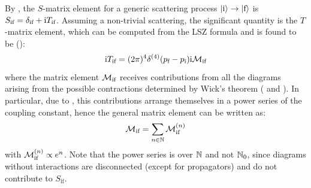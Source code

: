 By , the $ S $-matrix element for a generic scattering process $ \ket{\text{i}} \rightarrow \ket{\text{f}} $ is $ S_\text{if} = \delta_\text{if} + \mathrm{i} T_\text{if} $. Assuming a non-trivial scattering, the significant quantity is the $ T $-matrix element, which can be computed from the LSZ formula and is found to be ():
\begin{equation}
  \mathrm{i} T_\text{if} = (2\pi)^4 \delta^{(4)}(p_\text{f} - p_\text{i}) \mathrm{i} \mathcal{M}_\text{if}
\end{equation}
where the matrix element $ \mathcal{M}_\text{if} $ receives contributions from all the diagrams arising from the possible contractions determined by Wick's theorem ( and ). In particular, due to , this contributions arrange themselves in a power series of the coupling constant, hence the general matrix element can be written as:
\begin{equation}
  \mathcal{M}_\text{if} = \sum_{n \in \mathbb{N}} \mathcal{M}_\text{if}^{(n)}
\end{equation}
with $ \mathcal{M}_\text{if}^{(n)} \propto e^n $. Note that the power series is over $ \mathbb{N} $ and not $ \mathbb{N}_0 $, since diagrams without interactions are disconnected (except for propagators) and do not contribute to $ S_\text{if} $.


